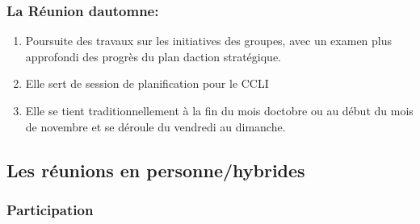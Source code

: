 \subsubsection{La Réunion d\textquotesingle automne:}
\label{la-reunion-d-automne}

\begin{enumerate}
 \item
  Poursuite des travaux sur les initiatives des groupes, avec un examen plus approfondi des progrès du plan d\textquotesingle action stratégique.
 \item
  Elle sert de session de planification pour le CCLI
 \item
  Elle se tient traditionnellement à la fin du mois d\textquotesingle octobre ou au début du mois de novembre et se déroule du vendredi au dimanche.
\end{enumerate}

\subsection{Les réunions en personne/hybrides}
\label{les-reunions-en-personne-hybrides}

\subsubsection{Participation}
\label{participation-1}

